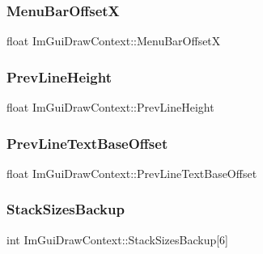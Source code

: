 \hypertarget{struct_im_gui_draw_context_a18a950aff641d2a87a3057e9449fdf36}{}\label{struct_im_gui_draw_context_a18a950aff641d2a87a3057e9449fdf36} 
\subsubsection{\texorpdfstring{Menu\+Bar\+OffsetX}{MenuBarOffsetX}}
{\footnotesize\ttfamily float Im\+Gui\+Draw\+Context\+::\+Menu\+Bar\+OffsetX}

\hypertarget{struct_im_gui_draw_context_ab4f6d19a049cff7a2fa5d1e9f5f132ab}{}\label{struct_im_gui_draw_context_ab4f6d19a049cff7a2fa5d1e9f5f132ab} 
\subsubsection{\texorpdfstring{Prev\+Line\+Height}{PrevLineHeight}}
{\footnotesize\ttfamily float Im\+Gui\+Draw\+Context\+::\+Prev\+Line\+Height}

\hypertarget{struct_im_gui_draw_context_a72d618764e8a78c5bb7879ad2fe5e308}{}\label{struct_im_gui_draw_context_a72d618764e8a78c5bb7879ad2fe5e308} 
\subsubsection{\texorpdfstring{Prev\+Line\+Text\+Base\+Offset}{PrevLineTextBaseOffset}}
{\footnotesize\ttfamily float Im\+Gui\+Draw\+Context\+::\+Prev\+Line\+Text\+Base\+Offset}

\hypertarget{struct_im_gui_draw_context_aedfc8e281f1d72c7c1882c36bebb00d1}{}\label{struct_im_gui_draw_context_aedfc8e281f1d72c7c1882c36bebb00d1} 
\subsubsection{\texorpdfstring{Stack\+Sizes\+Backup}{StackSizesBackup}}
{\footnotesize\ttfamily int Im\+Gui\+Draw\+Context\+::\+Stack\+Sizes\+Backup\mbox{[}6\mbox{]}}

